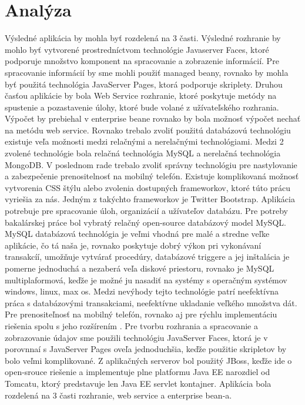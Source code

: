 \section{Analýza}
Výsledné aplikácia by mohla byť rozdelená na 3 časti. Výsledné rozhranie by mohlo byť vytvorené prostredníctvom technológie Javaserver Faces, ktoré podporuje množstvo komponent na spracovanie a zobrazenie informácií. Pre spracovanie informácií by sme mohli použiť managed beany, rovnako by mohla byť použitá technológia JavaServer Pages, ktorá podporuje skriplety. Druhou časťou aplikácie by bola Web Service rozhranie, ktoré poskytuje metódy na spustenie a pozastavenie úlohy, ktoré bude volané z užívateľského rozhrania. Výpočet by prebiehal v enterprise beane rovnako by bola možnosť výpočet nechať na metódu web service. Rovnako trebalo zvoliť použitú databázovú technológiu existuje veľa možnosti medzi relačnými a nerelačnými technológiami. Medzi 2 zvolené technológie bola relačná technológia MySQL a nerelačná technológia MongoDB. V poslednom rade trebalo zvoliť správny technológiu pre nastylovanie a zabezpečenie prenositelnosť na mobilný telefón. Existuje komplikovaná možnosť  vytvorenia CSS štýlu alebo zvolenia dostupných frameworkov, ktoré túto prácu vyriešia za nás. Jedným z takýchto frameworkov je Twitter Bootstrap. Aplikácia potrebuje pre spracovanie úloh, organizácií a užívateľov databázu. Pre potreby bakalárskej práce bol vybratý relačný open-source databázový model MySQL. MySQL databázová technológia je veľmi vhodná pre malé a stredne veľke aplikácie, čo tá naša je, rovnako poskytuje dobrý výkon pri vykonávaní transakcíí, umožňuje vytvárať procedúry, databázové triggere a jej inštalácia je pomerne jednoduchá a nezaberá veľa diskové priestoru, rovnako je MySQL multiplaformová, keďže je možné ju nasadiť na systémy s operačným systémov windows, linux, max os. Medzi nevýhody tejto technológie patrí neefektívna práca s databázovými transakciami, neefektívne ukladanie veľkého množstva dát. Pre prenositeľnosť na mobilný telefón, rovnako aj pre rýchlu implementáciu riešenia spolu s jeho rozšírením . Pre tvorbu rozhrania a spracovanie a zobrazovanie údajov sme použili technológiu JavaServer Faces, ktorá je v porovnnaí s JavaServer Pages oveľa jednoduchšia, keďže použitie skripletov by bolo veľmi komplikované. Z aplikačných serverov bol použitý JBoss, keďže ide o open-srouce riešenie a implementuje plne platformu Java EE narozdiel od Tomcatu, ktorý predstavuje len Java EE servlet kontajner. Aplikácia bola rozdelená na 3 časti rozhranie, web service a enterprise bean-a.



